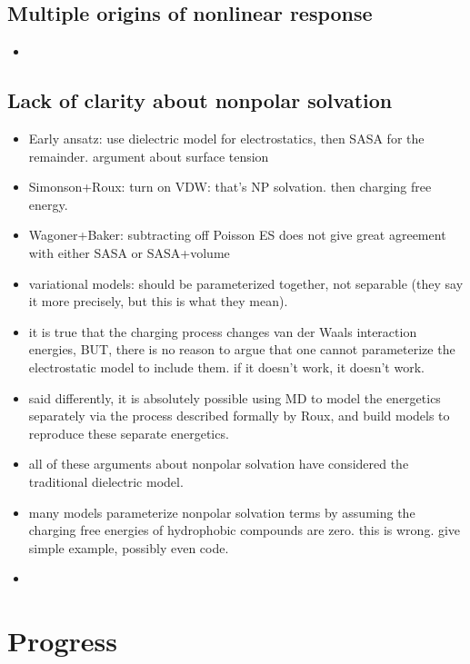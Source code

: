 \documentclass[reprint, letterpaper, nobibnotes, aps, superscriptaddress,prb]{revtex4-1}
\begin{document}
\subsection{Multiple origins of nonlinear response}
\begin{itemize}
\item 
\end{itemize}

\subsection{Lack of clarity about nonpolar solvation}
\begin{itemize}
\item Early ansatz: use dielectric model for electrostatics, then SASA for the remainder. argument about surface tension
\item Simonson+Roux: turn on VDW: that's NP solvation. then charging free energy.
\item Wagoner+Baker: subtracting off Poisson ES does not give great agreement with either SASA or SASA+volume
\item variational models: should be parameterized together, not separable (they say it more precisely, but this is what they mean).
\item it is true that the charging process changes van der Waals interaction energies, BUT, there is no reason to argue that one cannot parameterize the electrostatic model to include them. if it doesn't work, it doesn't work.
\item said differently, it is absolutely possible using MD to model the energetics separately via the process described formally by Roux, and build models to reproduce these separate energetics.
\item all of these arguments about nonpolar solvation have considered the traditional dielectric model.  
\item many models parameterize nonpolar solvation terms by assuming the charging free energies of hydrophobic compounds are zero. this is wrong. give simple example, possibly even code.
\item 
\end{itemize}

\section{Progress}
\end{document}
